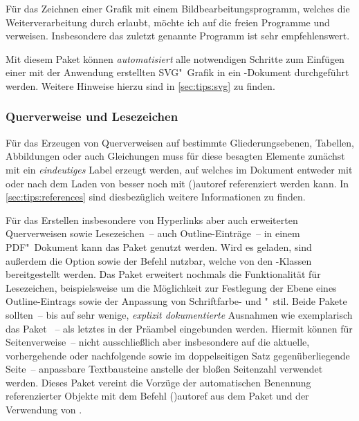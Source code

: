 Für das Zeichnen einer Grafik mit einem Bildbearbeitungsprogramm, welches die 
Weiterverarbeitung durch  erlaubt, möchte ich auf die freien 
Programme  und  verweisen. 
Insbesondere das zuletzt genannte Programm ist sehr empfehlenswert. 

\begin{DeclarePackages}[Grafiken|?]
  Mit diesem Paket können \emph{automatisiert} alle notwendigen Schritte zum 
  Einfügen einer mit der Anwendung  erstellten 
  SVG"~Grafik in ein -Dokument durchgeführt werden. Weitere 
  Hinweise hierzu sind in \autoref{sec:tips:svg} zu finden.
\end{DeclarePackages}



\subsubsection{%
  Querverweise und Lesezeichen%
}

Für das Erzeugen von Querverweisen auf bestimmte Gliederungsebenen, Tabellen, 
Abbildungen oder auch Gleichungen muss für diese besagten Elemente zunächst mit 
 ein \emph{eindeutiges} Label erzeugt werden, auf 
welches im Dokument entweder mit  oder nach dem Laden von 
 besser noch mit \Macro(){autoref} 
referenziert werden kann. In \autoref{sec:tips:references} sind diesbezüglich 
weitere Informationen zu finden.

\begin{DeclarePackages}
  Für das Erstellen insbesondere von Hyperlinks aber auch erweiterten 
  Querverweisen sowie Lesezeichen~-- auch Outline-Einträge~-- in einem 
  PDF"~Dokument kann das Paket  genutzt werden. Wird 
  es geladen, sind außerdem die Option  sowie der Befehl 
   nutzbar, welche von den \TUDScript-Klassen bereitgestellt 
  werden. Das Paket  erweitert nochmals die Funktionalität 
  für Lesezeichen, beispielsweise um die Möglichkeit zur Festlegung der Ebene 
  eines Outline-Eintrags sowie der Anpassung von Schriftfarbe- und "~stil.
  Beide Pakete sollten~-- bis auf sehr wenige, \emph{explizit dokumentierte} 
  Ausnahmen wie exemplarisch das Paket ~-- als letztes in 
  der Präambel eingebunden werden.
  Hiermit können für Seitenverweise~-- nicht ausschließlich aber insbesondere 
  auf die aktuelle, vorhergehende oder nachfolgende sowie im doppelseitigen 
  Satz gegenüberliegende Seite~-- anpassbare Textbausteine anstelle der bloßen 
  Seitenzahl verwendet werden.
  Dieses Paket vereint die Vorzüge der automatischen Benennung referenzierter 
  Objekte mit dem Befehl \Macro(){autoref} aus dem 
  Paket  und der Verwendung von .
\end{DeclarePackages}



